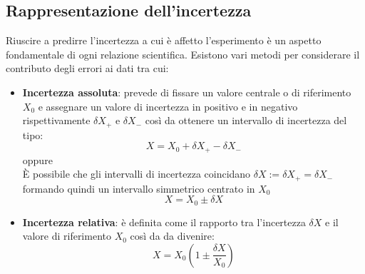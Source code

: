 \documentclass[11pt,a4paper]{book}
\begin{document}
\subsection{Rappresentazione dell'incertezza} 
Riuscire a predirre l'incertezza a cui è affetto l'esperimento è un aspetto fondamentale di ogni relazione scientifica. Esistono vari metodi per considerare il contributo degli errori ai dati tra cui:
\begin{itemize}
\item \textbf{Incertezza assoluta}: prevede di fissare un valore centrale o di riferimento $ X_0 $ e assegnare un valore di incertezza in positivo e in negativo rispettivamente $ \delta X_+ $ e $ \delta X_- $ così da ottenere un intervallo di incertezza del tipo:
\begin{equation}
X = X_0 +\delta X_+    -\delta X_- 
\end{equation}
oppure
\begin{equation}
[X_0 - \delta X_- ; X_0 + \delta X_+ ]
\end{equation}
\`{E} possibile che gli intervalli  di incertezza coincidano $\delta X :=  \delta X_+ = \delta X_-  $ formando quindi un intervallo simmetrico centrato in $ X_0 $
\begin{equation}
X = X_0 \pm \delta X
\end{equation}
\item \textbf{Incertezza relativa}: è definita come il rapporto tra l'incertezza $ \delta X  $  e il valore di riferimento $ X_0 $ così da da divenire:
\begin{equation}
X = X_0 \left( 1 \pm \frac{\delta X}{X_0} \right) 
\end{equation}
\end{itemize}
\end{document}
